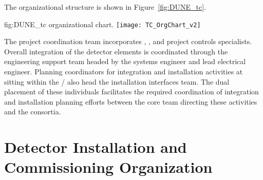 The   organizational structure is shown 
in Figure~\ref{fig:DUNE_tc}.  

\begin{dunefigure}{fig:DUNE_tc}
  {  organizational chart.}
  \texttt{[image: TC\_OrgChart\_v2]}
\end{dunefigure}

The  project coordination team incorporates , 
, and project controls specialists.  Overall integration 
of the detector elements is coordinated through the  
engineering support team headed by the  systems 
engineer and lead  electrical engineer.  Planning 
coordinators for integration and installation activities at 
 sitting within the /  also head the  installation interfaces team.  
The dual placement of these individuals facilitates the required 
coordination of integration and installation planning efforts between 
the core team directing these activities and the  
consortia. 

                                          \begin{comment}  %
The \dword{dune} project has already completed an initial round of design 
and prototyping culminating in the construction and operation 
of the \dword{protodune} detectors.  Moving forward, the project is 
updating detector component designs to incorporate lessons learned from 
the \dword{protodune} experience.  Then the designs are final, the 
project will first construct production versions of all components to be installed and operated in a second phase of \dword{protodune} 
operations before starting full-scale production.  The operation 
of each \dword{protodune2} detector will begin roughly two years after
the end of operations for its corresponding \dword{protodune} detector.
In a few cases, production of components requiring a long lead time must 
be started in parallel with the operation of first production components 
in \dword{protodune2}.
                                          \end{comment}  %

\section{Detector Installation and Commissioning Organization}
\label{sec:es-tc-det-instal}

